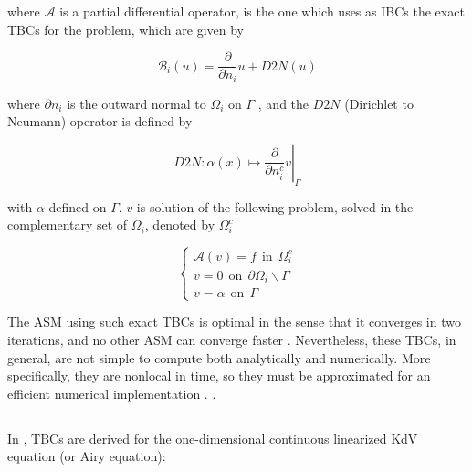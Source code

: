 \noindent where $\mathcal{A}$ is a partial differential operator, is the one which uses as IBCs the exact TBCs for the problem, which are given by

$$\mathcal{B}_i(u) = \frac{\partial}{\partial n_i}u + D2N(u)$$

\noindent where $\partial n_i$ is the outward normal to $\Omega_i$ on $\Gamma$ , and the $D2N$ (Dirichlet to Neumann) operator is defined by

$$\left. D2N : \alpha(x) \mapsto \frac{\partial}{\partial n_i^c}v \right\rvert_\Gamma$$

\noindent with $\alpha$ defined on $\Gamma$. $v$ is solution of the following problem, solved in the complementary set of $\Omega_i$, denoted by $\Omega_i^c$

\begin{equation*}
\begin{cases}
\mathcal{A}(v) = f \ \ \text{in} \ \ \Omega_i^c\\
v = 0 \ \ \text{on} \ \ \partial \Omega_i \backslash \Gamma \\
v = \alpha \ \ \text{on} \ \ \Gamma
\end{cases}
\end{equation*}

\indent The ASM using such exact TBCs is optimal in the sense that it converges in two iterations, and no other ASM can converge faster \cite{Japhet2003}. Nevertheless, these TBCs, in general, are not simple to compute both analytically and numerically. More specifically, they are nonlocal in time, so they must be approximated for an efficient numerical implementation \cite{Xavieretal2008}.  \cite{besse2015}.  

\subsection{}
\label{sec:TBC}

\indent In \cite{besse2015}, TBCs are derived for the one-dimensional continuous linearized KdV equation (or Airy equation):

